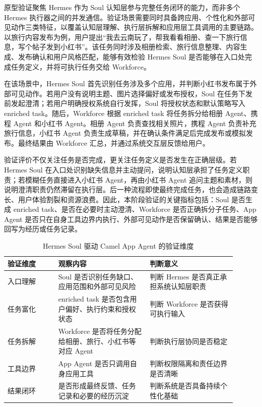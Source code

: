 原型验证聚焦 Hermes 作为 Soul 认知层参与完整任务闭环的能力，而非多个 Hermes 执行器之间的并发通信。验证场景需要同时具备跨应用、个性化和外部可见动作三类特征，以覆盖认知层理解、执行层拆解和应用层工具调用的主要链路。以旅行内容发布为例，用户提出“我去云南玩了，帮我看看相册、查一下旅行信息，写个帖子发到小红书”。该任务同时涉及相册检索、旅行信息整理、内容生成、发布确认和用户风格匹配，能够有效检验 Hermes Soul 是否能够在入口处完成任务定义，并将可执行任务交给 Workforce。

在该场景中，Hermes Soul 首先识别任务涉及多个应用，并判断小红书发布属于外部可见动作。若用户没有说明主题、图片选择偏好或发布授权，Soul 在任务下发前发起澄清；若用户明确授权系统自行发挥，Soul 将授权状态和默认策略写入 enriched task。随后，Workforce 根据 enriched task 将任务拆分给相册 Agent、携程 Agent 和小红书 Agent。相册 Agent 负责查找相关照片，携程 Agent 负责补充旅行信息，小红书 Agent 负责生成草稿，并在确认条件满足后完成发布或模拟发布。最终结果由 Workforce 汇总，并通过系统交互层反馈给用户。

验证评价不仅关注任务是否完成，更关注任务定义是否发生在正确层级。若 Hermes Soul 在入口处识别缺失信息并主动提问，说明认知层承担了任务定义职责；若模糊任务直接进入小红书 Agent，再由小红书 Agent 追问主题和素材，则说明澄清职责仍然滞留在执行层。后一种流程即使最终完成任务，也会造成链路变长、用户体验割裂和资源浪费。因此，本阶段验证的关键指标包括：Soul 是否生成 enriched task、是否在必要时主动澄清、Workforce 是否正确拆分子任务、App Agent 是否只在自身工具边界内执行、外部可见动作是否保留确认、结果是否能够回写为经历或任务记录。

\begin{table}[h]
\centering
\begin{tabular}{p{0.20\linewidth}p{0.36\linewidth}p{0.34\linewidth}}
\hline
\textbf{验证维度} & \textbf{观察内容} & \textbf{判断意义} \\
\hline
入口理解 & Soul 是否识别任务缺口、应用范围和外部可见风险 & 判断 Hermes 是否真正承担系统认知层职责 \\
任务富化 & enriched task 是否包含用户偏好、执行约束和授权状态 & 判断 Workforce 是否获得可执行输入 \\
任务拆解 & Workforce 是否将任务分配给相册、旅行、小红书等对应 Agent & 判断执行层协同是否稳定 \\
工具边界 & App Agent 是否只调用自身应用工具 & 判断权限隔离和责任边界是否清晰 \\
结果闭环 & 是否形成最终反馈、任务记录和必要的经历沉淀 & 判断系统是否具备持续个性化基础 \\
\hline
\end{tabular}
\caption{Hermes Soul 驱动 Camel App Agent 的验证维度}
\label{tab:rt3-validation-dimensions}
\end{table}

